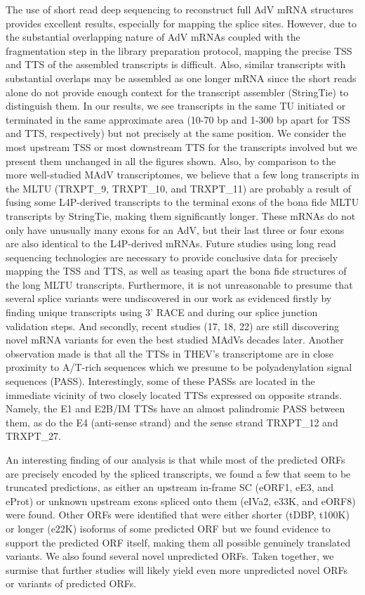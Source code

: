 \documentclass[
]{article}
\begin{document}
The use of short read deep sequencing to reconstruct full AdV mRNA
structures provides excellent results, especially for mapping the splice
sites. However, due to the substantial overlapping nature of AdV mRNAs
coupled with the fragmentation step in the library preparation protocol,
mapping the precise TSS and TTS of the assembled transcripts is
difficult. Also, similar transcripts with substantial overlaps may be
assembled as one longer mRNA since the short reads alone do not provide
enough context for the transcript assembler (StringTie) to distinguish
them. In our results, we see transcripts in the same TU initiated or
terminated in the same approximate area (10-70 bp and 1-300 bp apart for
TSS and TTS, respectively) but not precisely at the same position. We
consider the most upstream TSS or most downstream TTS for the
transcripts involved but we present them unchanged in all the figures
shown. Also, by comparison to the more well-studied MAdV transcriptomes,
we believe that a few long transcripts in the MLTU (TRXPT\_9, TRXPT\_10,
and TRXPT\_11) are probably a result of fusing some L4P-derived
transcripts to the terminal exons of the bona fide MLTU transcripts by
StringTie, making them significantly longer. These mRNAs do not only
have unusually many exons for an AdV, but their last three or four exons
are also identical to the L4P-derived mRNAs. Future studies using long
read sequencing technologies are necessary to provide conclusive data
for precisely mapping the TSS and TTS, as well as teasing apart the bona
fide structures of the long MLTU transcripts. Furthermore, it is not
unreasonable to presume that several splice variants were undiscovered
in our work as evidenced firstly by finding unique transcripts using 3'
RACE and during our splice junction validation steps. And secondly,
recent studies (17, 18, 22) are still discovering novel mRNA variants
for even the best studied MAdVs decades later. Another observation made
is that all the TTSs in THEV's transcriptome are in close proximity to
A/T-rich sequences which we presume to be polyadenylation signal
sequences (PASS). Interestingly, some of these PASSs are located in the
immediate vicinity of two closely located TTSs expressed on opposite
strands. Namely, the E1 and E2B/IM TTSs have an almost palindromic PASS
between them, as do the E4 (anti-sense strand) and the sense strand
TRXPT\_12 and TRXPT\_27.

An interesting finding of our analysis is that while most of the
predicted ORFs are precisely encoded by the spliced transcripts, we
found a few that seem to be truncated predictions, as either an upstream
in-frame SC (eORF1, eE3, and eProt) or unknown upstream exons spliced
onto them (eIVa2, e33K, and eORF8) were found. Other ORFs were
identified that were either shorter (tDBP, t100K) or longer (e22K)
isoforms of some predicted ORF but we found evidence to support the
predicted ORF itself, making them all possible genuinely translated
variants. We also found several novel unpredicted ORFs. Taken together,
we surmise that further studies will likely yield even more unpredicted
novel ORFs or variants of predicted ORFs.
\end{document}
